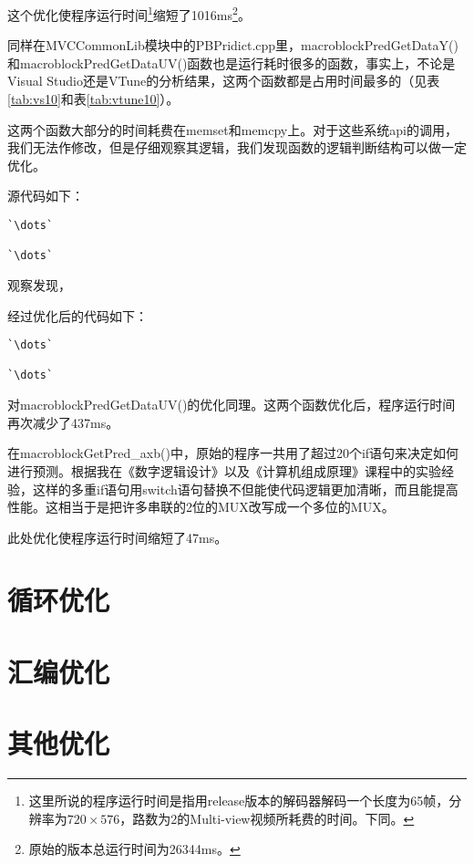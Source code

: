 这个优化使程序运行时间\footnote{这里所说的程序运行时间是指用release版本的解码器解码一个长度为65帧，分辨率为$720\times576$，路数为2的Multi-view视频所耗费的时间。下同。}缩短了1016ms\footnote{原始的版本总运行时间为26344ms。}。

同样在MVCCommonLib模块中的PBPridict.cpp里，macroblockPredGetDataY()和macroblockPredGetDataUV()函数也是运行耗时很多的函数，事实上，不论是Visual Studio还是VTune的分析结果，这两个函数都是占用时间最多的（见表\ref{tab:vs10}和表\ref{tab:vtune10}）。

这两个函数大部分的时间耗费在memset和memcpy上。对于这些系统api的调用，我们无法作修改，但是仔细观察其逻辑，我们发现函数的逻辑判断结构可以做一定优化。

源代码如下：

\begin{lstlisting}[caption = {macroblockPredGetDataY()函数片段（优化前）}, label = lst:macroblockPredGetDataYorig]
`\dots`

`\dots`
\end{lstlisting}

观察发现，

经过优化后的代码如下：

\begin{lstlisting}[caption = {macroblockPredGetDataY()函数片段（优化后）}, label = lst:macroblockPredGetDataYopt]
`\dots`

`\dots`
\end{lstlisting}

对macroblockPredGetDataUV()的优化同理。这两个函数优化后，程序运行时间再次减少了437ms。

在macroblockGetPred\_axb()中，原始的程序一共用了超过20个if语句来决定如何进行预测。根据我在《数字逻辑设计》以及《计算机组成原理》课程中的实验经验，这样的多重if语句用switch语句替换不但能使代码逻辑更加清晰，而且能提高性能。这相当于是把许多串联的2位的MUX改写成一个多位的MUX。

此处优化使程序运行时间缩短了47ms。

\section{循环优化}
\label{sec:singlecoreloopopt}


\section{汇编优化}
\label{sec:singlecoreasmopt}


\section{其他优化}
\label{sec:singlecoreothers}

